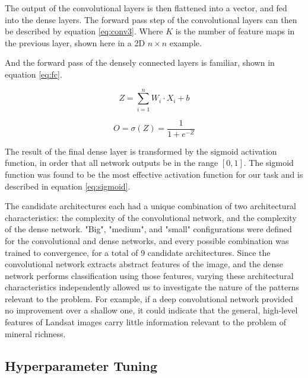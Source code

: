 \documentclass[10pt]{article}
\begin{document}
The output of the convolutional layers is then flattened into a vector, and fed
into the dense layers. The forward pass step of the convolutional layers can
then be described by equation \ref{eq:conv3}. Where $K$ is the number of feature
maps in the previous layer, shown here in a 2D $n \times n$ example.

And the forward pass of the densely connected layers is familiar, shown in 
equation \ref{eq:fc}.

\begin{minipage}{0.45\linewidth}
  \begin{equation}\label{eq:fc}
    Z = \sum_{i=1}^{n} W_{i} \cdot X_{i} + b
  \end{equation}
\end{minipage}
\hfill
\begin{minipage}{0.45\linewidth}
  \begin{equation}\label{eq:sigmoid}
    O = \sigma(Z) = \frac{1}{1 + e^{-Z}}
  \end{equation}
\end{minipage}

The result of the final dense layer is transformed by the sigmoid activation function,
in order that all network outputs be in the range $[0,1]$. The sigmoid function
was found to be the most effective activation function for our task and is described
in equation \ref{eq:sigmoid}.

The candidate architectures each had a unique combination of two architectural
characteristics: the complexity of the convolutional network, and the complexity
of the dense network. "Big", "medium", and "small" configurations were defined
for the convolutional and dense networks, and every possible combination was
trained to convergence, for a total of 9 candidate architectures. Since the
convolutional network extracts abstract features of the image, and the dense
network performs classification using those features, varying these architectural
characteristics independently allowed us to investigate the nature of the patterns
relevant to the problem. For example, if a deep convolutional network provided no
improvement over a shallow one, it could indicate that the general, high-level
features of Landsat images carry little information relevant to the problem of
mineral richness.

\subsection{Hyperparameter Tuning}
\end{document}
